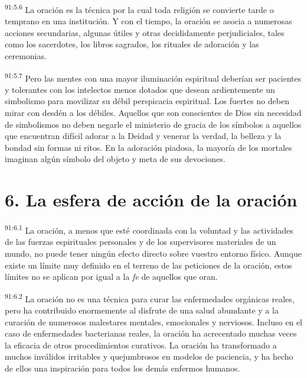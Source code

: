 \par
\textsuperscript{91:5.6} La oración es la técnica por la cual toda religión se convierte tarde o temprano en una institución. Y con el tiempo, la oración se asocia a numerosas acciones secundarias, algunas útiles y otras decididamente perjudiciales, tales como los sacerdotes, los libros sagrados, los rituales de adoración y las ceremonias.

\par
\textsuperscript{91:5.7} Pero las mentes con una mayor iluminación espiritual deberían ser pacientes y tolerantes con los intelectos menos dotados que desean ardientemente un simbolismo para movilizar su débil perspicacia espiritual. Los fuertes no deben mirar con desdén a los débiles. Aquellos que son conscientes de Dios sin necesidad de simbolismos no deben negarle el ministerio de gracia de los símbolos a aquellos que encuentran difícil adorar a la Deidad y venerar la verdad, la belleza y la bondad sin formas ni ritos. En la adoración piadosa, la mayoría de los mortales imaginan algún símbolo del objeto y meta de sus devociones.

\section*{6. La esfera de acción de la oración}
\par
\textsuperscript{91:6.1} La oración, a menos que esté coordinada con la voluntad y las actividades de las fuerzas espirituales personales y de los supervisores materiales de un mundo, no puede tener ningún efecto directo sobre vuestro entorno físico. Aunque existe un límite muy definido en el terreno de las peticiones de la oración, estos límites no se aplican por igual a la \textit{fe} de aquellos que oran.

\par
\textsuperscript{91:6.2} La oración no es una técnica para curar las enfermedades orgánicas reales, pero ha contribuido enormemente al disfrute de una salud abundante y a la curación de numerosos malestares mentales, emocionales y nerviosos. Incluso en el caso de enfermedades bacterianas reales, la oración ha acrecentado muchas veces la eficacia de otros procedimientos curativos. La oración ha transformado a muchos inválidos irritables y quejumbrosos en modelos de paciencia, y ha hecho de ellos una inspiración para todos los demás enfermos humanos.

